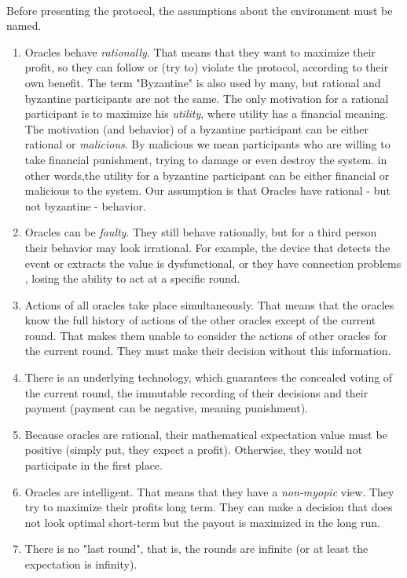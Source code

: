 \documentclass{article}
\begin{document}
\paragraph{ }
Before presenting the protocol, the assumptions about the environment must be named. 
\begin{enumerate}
  \item Oracles behave \emph{rationally}. That means that they want to maximize their profit, so they can follow or (try to) violate the protocol, according to their own benefit. The term "Byzantine" is also used by many, but rational and byzantine participants are not the same. The only motivation for a rational participant is to maximize his \emph{utility}, where utility has a financial meaning. The motivation (and behavior) of a byzantine participant can be either rational or \emph{malicious}. By malicious we mean participants who are willing to take financial punishment, trying to damage or even destroy the system. in other words,the utility for a byzantine participant can be either financial or malicious to the system. Our assumption is that Oracles have rational - but not byzantine - behavior.
  \item Oracles can be \emph{faulty}. They still behave rationally, but for a third person their behavior may look irrational. For example, the device that detects the event or extracts the value is dysfunctional, or they have connection problems , losing the ability to act at a specific round.
  \item Actions of all oracles take place simultaneously. That means that the oracles know the full history of actions of the other oracles except of the current round. That makes them unable to consider the actions of other oracles for the current round. They must make their decision without this information.
  \item There is an underlying technology, which guarantees the concealed voting of the current round, the immutable recording of their decisions and their payment (payment can be negative, meaning punishment).
  \item Because oracles are rational, their mathematical expectation value must be positive (simply put, they expect a profit). Otherwise, they would not participate in the first place.
  \item Oracles are intelligent. That means that they have a \emph{non-myopic} view. They try to maximize their profits long term. They can make a decision that does not look optimal short-term but the payout is maximized in the long run.
  \item There is no "last round", that is, the rounds are infinite (or at least the expectation is infinity).
  
\end{enumerate} 
\end{document}
